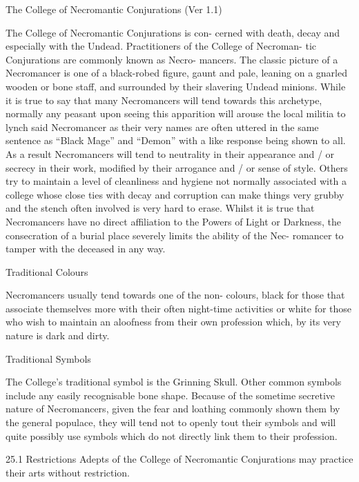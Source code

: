 \begin{Chapter}{The College of Necromantic Conjurations (Ver 1.1)}

The  College  of  Necromantic  Conjurations  is  con-
cerned  with  death,  decay  and  especially  with  the 
Undead. Practitioners of the College of Necroman-
tic  Conjurations  are  commonly  known  as  Necro-
mancers.  The  classic  picture  of  a  Necromancer  is 
one of a black-robed figure, gaunt and pale, leaning 
on a gnarled wooden or bone staff, and surrounded 
by their slavering Undead minions. While it is true 
to  say  that  many  Necromancers  will  tend  towards 
this  archetype,  normally  any  peasant  upon  seeing 
this apparition will arouse the local militia to lynch 
said  Necromancer  as  their  very  names  are  often 
uttered in the same sentence as “Black Mage” and 
“Demon”  with  a  like  response  being shown  to  all. 
As a result Necromancers will tend to neutrality in 
their  appearance  and  /  or  secrecy  in  their  work, 
modified by their arrogance and / or sense of style. 
Others  try  to  maintain  a  level  of  cleanliness  and 
hygiene  not  normally  associated  with  a  college 
whose  close  ties  with  decay  and  corruption  can 
make  things  very  grubby  and  the  stench  often 
involved is very hard to erase. Whilst it is true that 
Necromancers  have  no  direct  affiliation  to  the 
Powers of Light or Darkness, the consecration of a 
burial  place  severely  limits  the  ability  of  the  Nec-
romancer to tamper with the deceased in any way. 

Traditional Colours 

Necromancers usually tend towards one of the non-
colours,  black  for  those  that  associate  themselves 
more with their often night-time activities or white 
for  those  who  wish  to  maintain  an  aloofness  from 
their  own  profession  which,  by  its  very  nature  is 
dark and dirty. 

Traditional Symbols 

The  College’s  traditional  symbol  is  the  Grinning 
Skull.  Other  common  symbols  include  any  easily 
recognisable bone shape. Because of the sometime 
secretive  nature  of  Necromancers,  given  the  fear 
and loathing commonly shown them by the general 
populace,  they  will  tend  not  to  openly  tout  their 
symbols and will quite possibly use symbols which 
do not directly link them to their profession. 

25.1 Restrictions 
Adepts of the College of Necromantic Conjurations 
may practice their arts without restriction. 


\end{Chapter}
